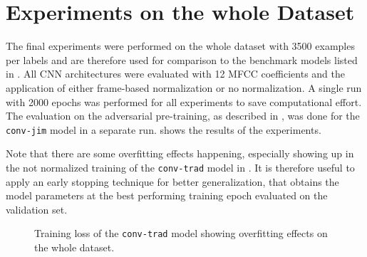 
\section{Experiments on the whole Dataset}\label{sec:exp_final}
The final experiments were performed on the whole dataset with 3500 examples per labels and are therefore used for comparison to the benchmark models listed in .
All CNN architectures were evaluated with 12 MFCC coefficients and the application of either frame-based normalization or no normalization.
A single run with 2000 epochs was performed for all experiments to save computational effort.
The evaluation on the adversarial pre-training, as described in , was done for the \texttt{conv-jim} model in a separate run.
 shows the results of the experiments.

Note that there are some overfitting effects happening, especially showing up in the not normalized training of the \texttt{conv-trad} model in .
It is therefore useful to apply an early stopping technique for better generalization, that obtains the model parameters at the best performing training epoch evaluated on the validation set.
\begin{figure}[!ht]
  \centering
  \quad
  \caption{Training loss of the \texttt{conv-trad} model showing overfitting effects on the whole dataset.}
  \label{fig:exp_final_loss_conv-trad}
\end{figure}

